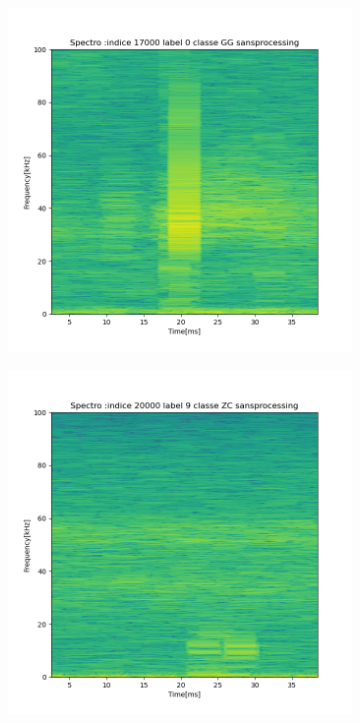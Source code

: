 \begin{figure}[!h]
  \centering
  \begin{subfigure}[b]{0.3\textwidth}
    \includegraphics[width=\textwidth]{./images/indice17000Spectro2Dlabel0classeGGsansprocessingsanszoom.png}
    \caption{}
  \end{subfigure}
  \begin{subfigure}[b]{0.3\textwidth}
    \includegraphics[width=\textwidth]{./images/indice20000Spectro2Dlabel9classeZCsansprocessingsanszoom.png}

\end{subfigure}
\end{figure}
